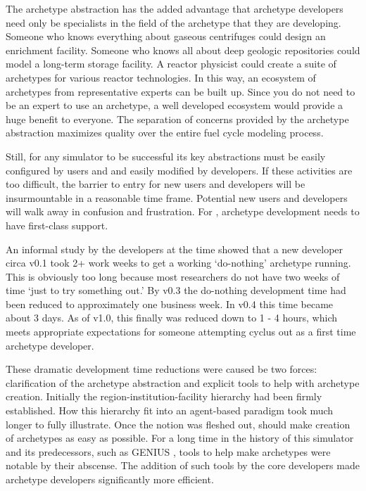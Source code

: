 The archetype abstraction has the added advantage that archetype developers 
need only be specialists in the field of the archetype that they are developing.
Someone who knows everything about gaseous centrifuges could design 
an enrichment facility. Someone who knows all about deep geologic repositories
could model a long-term storage facility. A reactor physicist could create 
a suite of archetypes for various reactor technologies. In this way, an ecosystem 
of archetypes from representative experts can be built up. Since you do not need
to be an expert to use an archetype, a well developed ecosystem would provide 
a huge benefit to everyone. The separation of concerns provided by the archetype 
abstraction maximizes quality over the entire fuel cycle modeling process.

Still, for any simulator to be successful its key abstractions must be easily 
configured by users and and easily modified by developers.  If these activities are 
too difficult, the barrier to entry for new users and developers will be 
insurmountable in a reasonable time frame. Potential new users and developers will 
walk away in confusion and frustration. For \cyclus, archetype development
needs to have first-class support.

An informal study 
by the developers at the time showed that a new developer circa \cyclus v0.1
took 2+ work weeks to get a working `do-nothing' archetype running. This is obviously 
too long because most researchers do not have two weeks of time `just to try 
something out.' By \cyclus v0.3 the do-nothing development time had been reduced 
to approximately one business week. In \cyclus v0.4 this time became about 3 days.
As of \cyclus v1.0, this finally was reduced down to 1 - 4 hours, which meets
appropriate expectations for someone attempting cyclus out as a first time archetype 
developer.

These dramatic development time reductions were caused be two forces:
clarification of the archetype abstraction and explicit tools to help with 
archetype creation. Initially the region-institution-facility hierarchy 
had been firmly established. How this hierarchy fit into an agent-based 
paradigm took much longer to fully illustrate. Once the notion was fleshed out,
\Cyclus should make creation of archetypes as easy as possible. 
For a long time in the history of this simulator and its predecessors, such as 
GENIUS \citeme, tools to help make archetypes were notable by their abscense. 
The addition of such tools by the \cyclus core developers made archetype
developers significantly more efficient.


